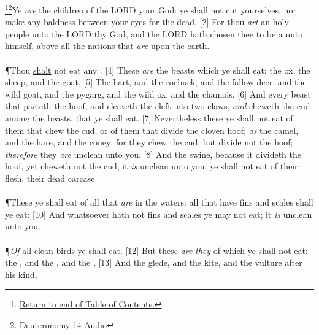 \footnote{\textcolor[cmyk]{0.99998,1,0,0}{\hyperlink{TOC}{Return to end of Table of Contents.}}}\footnote{\href{https://audiobible.com/bible/deuteronomy_14.html}{\textcolor[cmyk]{0.99998,1,0,0}{Deuteronomy 14 Audio}}}\textcolor[cmyk]{0.99998,1,0,0}{Ye \emph{are} the children of the LORD your God: ye shall not cut yourselves, nor make any baldness between your eyes for the dead.}
[2] \textcolor[cmyk]{0.99998,1,0,0}{For thou \emph{art} an holy people unto the LORD thy God, and the LORD hath chosen thee to be a  unto himself, above all the nations that \emph{are} upon the earth.}\\
\\
\P \textcolor[cmyk]{0.99998,1,0,0}{Thou \underline{shalt} not eat any .}
[4] \textcolor[cmyk]{0.99998,1,0,0}{These \emph{are} the beasts which ye shall eat: the ox, the sheep, and the goat,}
[5] \textcolor[cmyk]{0.99998,1,0,0}{The hart, and the roebuck, and the fallow deer, and the wild goat, and the pygarg, and the wild ox, and the chamois.}
[6] \textcolor[cmyk]{0.99998,1,0,0}{And every beast that parteth the hoof, and cleaveth the cleft into two claws, \emph{and} cheweth the cud among the beasts, that ye shall eat.}
[7] \textcolor[cmyk]{0.99998,1,0,0}{Nevertheless these ye shall not eat of them that chew the cud, or of them that divide the cloven hoof; \emph{as} the camel, and the hare, and the coney: for they chew the cud, but divide not the hoof; \emph{therefore} they \emph{are} unclean unto you.}
[8] \textcolor[cmyk]{0.99998,1,0,0}{And the swine, because it divideth the hoof, yet cheweth not the cud, it \emph{is} unclean unto you: ye shall not eat of their flesh,  their dead carcase.}\\
\\
\P \textcolor[cmyk]{0.99998,1,0,0}{These ye shall eat of all that \emph{are} in the waters: all that have fins and scales shall ye eat:}
[10] \textcolor[cmyk]{0.99998,1,0,0}{And whatsoever hath not fins and scales ye may not eat; it \emph{is} unclean unto you.}\\
\\
\P \textcolor[cmyk]{0.99998,1,0,0}{\emph{Of} all clean birds ye shall eat.}
[12] \textcolor[cmyk]{0.99998,1,0,0}{But these \emph{are} \emph{they} of which ye shall not eat: the , and the , and the ,}
[13] \textcolor[cmyk]{0.99998,1,0,0}{And the glede, and the kite, and the vulture after his kind,}
